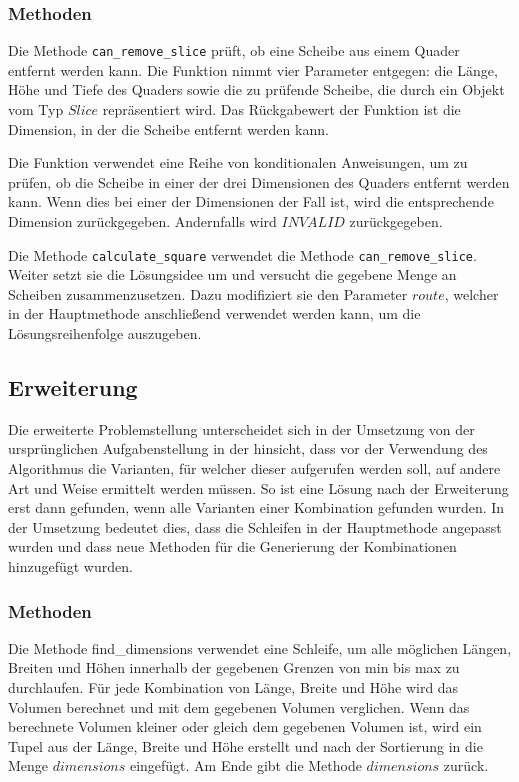 \documentclass[a4paper,10pt,ngerman]{scrartcl}
\begin{document}
    \subsubsection{Methoden}\label{subsubsec:methoden}

    Die Methode \texttt{can\_remove\_slice} prüft, ob eine Scheibe aus einem Quader entfernt werden kann.
    Die Funktion nimmt vier Parameter entgegen: die Länge, Höhe und Tiefe des Quaders sowie die zu prüfende Scheibe, die durch ein Objekt vom Typ $Slice$ repräsentiert wird.
    Das Rückgabewert der Funktion ist die Dimension, in der die Scheibe entfernt werden kann.

    Die Funktion verwendet eine Reihe von konditionalen Anweisungen,
    um zu prüfen, ob die Scheibe in einer der drei Dimensionen des Quaders entfernt werden kann.
    Wenn dies bei einer der Dimensionen der Fall ist, wird die entsprechende Dimension zurückgegeben.
    Andernfalls wird $INVALID$ zurückgegeben.

    Die Methode \texttt{calculate\_square} verwendet die Methode \texttt{can\_remove\_slice}.
    Weiter setzt sie die Lösungsidee um und versucht die gegebene Menge an Scheiben zusammenzusetzen.
    Dazu modifiziert sie den Parameter $route$, welcher in der Hauptmethode anschließend verwendet werden kann,
    um die Lösungsreihenfolge auszugeben.

    \subsection{Erweiterung}\label{subsec:erweiterung2}

    Die erweiterte Problemstellung unterscheidet sich in der Umsetzung von der ursprünglichen Aufgabenstellung in der hinsicht,
    dass vor der Verwendung des Algorithmus die Varianten, für welcher dieser aufgerufen werden soll, auf andere Art und Weise ermittelt werden müssen.
    So ist eine Lösung nach der Erweiterung erst dann gefunden, wenn alle Varianten einer Kombination gefunden wurden.
    In der Umsetzung bedeutet dies, dass die Schleifen in der Hauptmethode angepasst wurden
    und dass neue Methoden für die Generierung der Kombinationen hinzugefügt wurden.

    \subsubsection{Methoden}\label{subsubsec:methoden_erweiterung}

    Die Methode find\_dimensions verwendet eine Schleife,
    um alle möglichen Längen, Breiten und Höhen innerhalb der gegebenen Grenzen von min bis max zu durchlaufen.
    Für jede Kombination von Länge, Breite und Höhe wird das Volumen berechnet und mit dem gegebenen Volumen verglichen.
    Wenn das berechnete Volumen kleiner oder gleich dem gegebenen Volumen ist,
    wird ein Tupel aus der Länge, Breite und Höhe erstellt und nach der Sortierung in die Menge $dimensions$ eingefügt.
    Am Ende gibt die Methode $dimensions$ zurück.
\end{document}
